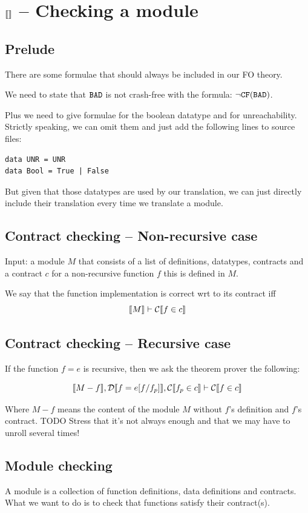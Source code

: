 \documentclass[preprint]{sigplanconf}
\begin{document}
\section{$\llbracket  \rrbracket$ -- Checking a module}

\subsection{Prelude}
There are some formulae that should always be included in our FO theory.

We need to state that $\texttt{BAD}$ is not crash-free with the formula:
$\lnot \texttt{CF}(\texttt{BAD})$.

Plus we need to give formulae for the boolean datatype and for
 unreachability. Strictly speaking, we can omit them and just add the
following lines to source files:
\begin{verbatim}
data UNR = UNR
data Bool = True | False
\end{verbatim}
But given that those datatypes are used by our translation, we can
just directly include their translation every time we translate a
module.

\subsection{Contract checking -- Non-recursive case}
Input: a module $M$ that consists of a list of definitions, datatypes,
contracts and a contract $c$ for a non-recursive function $f$ this is
defined in $M$.

We say that the function implementation is correct wrt to its contract
iff $$\llbracket M \rrbracket \vdash \mathcal{C} \llbracket f \in c \rrbracket$$

\subsection{Contract checking -- Recursive case}\label{sec:recursiveContracts}
If the function $f=e$ is recursive, then we ask the theorem prover the
following:

$$\llbracket M - f \rrbracket, \mathcal{D} \llbracket f=e[f/f_p] \rrbracket, \mathcal{C} \llbracket f_p \in c \rrbracket \vdash \mathcal{C} \llbracket f \in c \rrbracket$$

Where $M - f $ means the content of the module $M$ without $f$'s
definition and $f$'s contract. TODO Stress that it's not always enough
and that we may have to unroll several times!

\subsection{Module checking}
A module is a collection of function definitions, data definitions and
contracts. What we want to do is to check that functions satisfy their
contract(s). 
\end{document}
